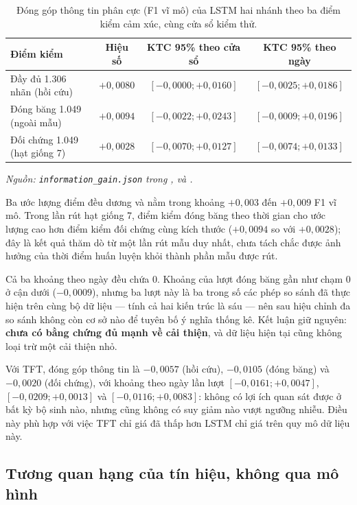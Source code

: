 \begin{table}[H]
  \centering
  \caption{Đóng góp thông tin phân cực (F1 vĩ mô) của LSTM hai nhánh theo ba điểm kiểm cảm xúc, cùng cửa sổ kiểm thử.}
  \label{tab:kq-pit}
  \begin{tabular}{l c c c}
    \toprule
    Điểm kiểm & Hiệu số & KTC 95\% theo cửa sổ & KTC 95\% theo ngày \\
    \midrule
    Đầy đủ 1.306 nhãn (hồi cứu) & $+0{,}0080$ & $[-0{,}0000; +0{,}0160]$ & $[-0{,}0025; +0{,}0186]$ \\
    Đóng băng 1.049 (ngoài mẫu) & $+0{,}0094$ & $[-0{,}0022; +0{,}0243]$ & $[-0{,}0009; +0{,}0196]$ \\
    Đối chứng 1.049 (hạt giống 7) & $+0{,}0028$ & $[-0{,}0070; +0{,}0127]$ & $[-0{,}0074; +0{,}0133]$ \\
    \bottomrule
  \end{tabular}
\noindent\textit{Nguồn: \texttt{information\_gain.json} trong ,  và .}
\end{table}

Ba ước lượng điểm đều dương và nằm trong khoảng $+0{,}003$ đến $+0{,}009$ F1 vĩ mô. Trong
lần rút hạt giống 7, điểm kiểm đóng băng theo thời gian cho ước lượng cao hơn điểm kiểm
đối chứng cùng kích thước ($+0{,}0094$ so với $+0{,}0028$); đây là kết quả thăm dò từ một
lần rút mẫu duy nhất, chưa tách chắc được ảnh hưởng của thời điểm huấn luyện khỏi thành
phần mẫu được rút.

Cả ba khoảng theo ngày đều chứa 0. Khoảng của lượt đóng băng gần như chạm 0 ở cận dưới
($-0{,}0009$), nhưng ba lượt này là ba trong số các phép so sánh đã thực hiện trên cùng bộ
dữ liệu --- tính cả hai kiến trúc là sáu --- nên sau hiệu chỉnh đa so sánh không còn cơ sở
nào để tuyên bố ý nghĩa thống kê. Kết luận giữ nguyên: \textbf{chưa có bằng chứng đủ mạnh
về cải thiện}, và dữ liệu hiện tại cũng không loại trừ một cải thiện nhỏ.

Với TFT, đóng góp thông tin là $-0{,}0057$ (hồi cứu), $-0{,}0105$ (đóng băng) và
$-0{,}0020$ (đối chứng), với khoảng theo ngày lần lượt $[-0{,}0161; +0{,}0047]$,
$[-0{,}0209; +0{,}0013]$ và $[-0{,}0116; +0{,}0083]$: không có lợi ích quan sát được ở bất
kỳ bộ sinh nào, nhưng cũng không có suy giảm nào vượt ngưỡng nhiễu. Điều này phù hợp với
việc TFT chỉ giá đã thấp hơn LSTM chỉ giá trên quy mô dữ liệu này.

\subsection{Tương quan hạng của tín hiệu, không qua mô hình}
\label{sec:kq-ic}

